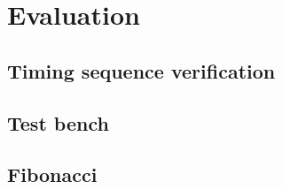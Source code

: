 \documentclass[11pt, a4paper, twoside]{article}
\begin{document}
\section{Evaluation}
\subsection{Timing sequence verification}
\subsection{Test bench}
\subsection{Fibonacci}
	
\end{document}
